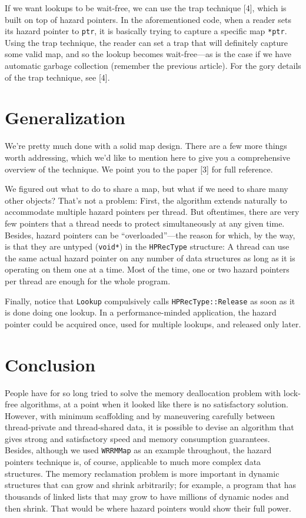 \documentclass[a4paper,12pt,notitlepage,twoside,openright]{article}
\begin{document}
If we want lookups to be wait-free, we can use the trap technique [4], which is built on top of hazard pointers. In the aforementioned code, when a reader sets its hazard pointer to \texttt{ptr}, it is basically trying to capture a specific map \texttt{*ptr}. Using the trap technique, the reader can set a trap that will definitely capture some valid map, and so the lookup becomes wait-free—as is the case if we have automatic garbage collection (remember the previous article). For the gory details of the trap technique, see [4].

\section{Generalization}

We're pretty much done with a solid map design. There are a few more things worth addressing, which we'd like to mention here to give you a comprehensive overview of the technique. We point you to the paper [3] for full reference.

We figured out what to do to share a map, but what if we need to share many other objects? That's not a problem: First, the algorithm extends naturally to accommodate multiple hazard pointers per thread. But oftentimes, there are very few pointers that a thread needs to protect simultaneously at any given time. Besides, hazard pointers can be ``overloaded''—the reason for which, by the way, is that they are untyped (\texttt{void*}) in the \texttt{HPRecType} structure: A thread can use the same actual hazard pointer on any number of data structures as long as it is operating on them one at a time. Most of the time, one or two hazard pointers per thread are enough for the whole program.

Finally, notice that \texttt{Lookup} compulsively calls \texttt{HPRecType::Release} as soon as it is done doing one lookup. In a performance-minded application, the hazard pointer could be acquired once, used for multiple lookups, and released only later.

\section{Conclusion}

People have for so long tried to solve the memory deallocation problem with lock-free algorithms, at a point when it looked like there is no satisfactory solution. However, with minimum scaffolding and by maneuvering carefully between thread-private and thread-shared data, it is possible to devise an algorithm that gives strong and satisfactory speed and memory consumption guarantees. Besides, although we used \texttt{WRRMMap} as an example throughout, the hazard pointers technique is, of course, applicable to much more complex data structures. The memory reclamation problem is more important in dynamic structures that can grow and shrink arbitrarily; for example, a program that has thousands of linked lists that may grow to have millions of dynamic nodes and then shrink. That would be where hazard pointers would show their full power.
\end{document}
